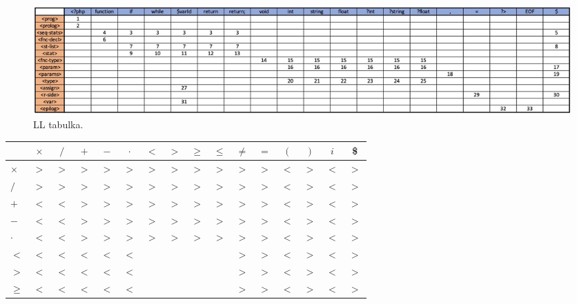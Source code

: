 \documentclass[a4paper, 12pt]{article}
\begin{document}
    \begin{figure}[h]
        \hspace*{-1cm}
        \centering
        \includegraphics[width=0.90\paperwidth]{src/LL-tabulka.png}
        \caption{LL tabulka.}
        \label{LL tabulka}
    \end{figure}

    \begin{table}[h]
        \centering
        \begin{tabular}[p]{| l | c | c | c | c | c | c | c | c | c | c | c | c | c | c | c |}
            \hline
            &   \textbf{$\times$} & \textbf{$/$} & \textbf{$+$} & \textbf{$-$} & \textbf{$\cdot$} & \textbf{$<$} & \textbf{$>$} & \textbf{{$\geq$}} & \textbf{$\leq$} & \textbf{$\neq$} & \textbf{$=$} & \textbf{$($} & \textbf{$)$} & \textbf{$i$} & \textbf{\$} \\
            \hline
            \textbf{$\times$} &
                $>$ & $>$ & $>$ & $>$ & $>$ & $>$ & $>$ & $>$ & $>$ & $>$ & $>$ & $<$ & $>$ & $<$ & $>$ \\
            \textbf{$/$} &
                $>$ & $>$ & $>$ & $>$ & $>$ & $>$ & $>$ & $>$ & $>$ & $>$ & $>$ & $<$ & $>$ & $<$ & $>$ \\
            \textbf{$+$} &
                $<$ & $<$ & $>$ & $>$ & $>$ & $>$ & $>$ & $>$ & $>$ & $>$ & $>$ & $<$ & $>$ & $<$ & $>$ \\
            \textbf{$-$} &
                $<$ & $<$ & $>$ & $>$ & $>$ & $>$ & $>$ & $>$ & $>$ & $>$ & $>$ & $<$ & $>$ & $<$ & $>$ \\
            \textbf{$\cdot$} &
                $<$ & $<$ & $>$ & $>$ & $>$ & $>$ & $>$ & $>$ & $>$ & $>$ & $>$ & $<$ & $>$ & $<$ & $>$ \\
            \textbf{$<$} &
                $<$ & $<$ & $<$ & $<$ & $<$ &     &     &     &     & $>$ & $>$ & $<$ & $>$ & $<$ & $>$ \\
            \textbf{$>$} &
                $<$ & $<$ & $<$ & $<$ & $<$ &     &     &     &     & $>$ & $>$ & $<$ & $>$ & $<$ & $>$ \\
            \textbf{$\geq$} &
                $<$ & $<$ & $<$ & $<$ & $<$ &     &     &     &     & $>$ & $>$ & $<$ & $>$ & $<$ & $>$ \\

\end{tabular}
\end{table}
\end{document}
